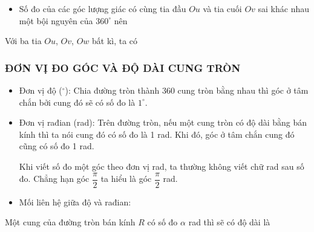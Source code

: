\begin{itemize}
\begin{center}
			\end{center}
			\item Số đo của các góc lượng giác có cùng tia đầu $Ou$ và tia cuối $Ov$ sai khác nhau một bội nguyên của $360^{\circ}$ nên
		\end{itemize}

	\iconMT {} Với ba tia $Ou$, $Ov$, $Ow$ bất kì, ta có


\subsubsection{ĐƠN VỊ ĐO GÓC VÀ ĐỘ DÀI CUNG TRÒN}
\iconMT {}
	\begin{itemize}
		\item Đơn vị độ ($^\circ$): Chia đường tròn thành 360 cung tròn bằng nhau thì góc ở tâm chắn bởi cung đó sẽ có số đo là $1^\circ$.
		\item Đơn vị rađian (rad): Trên đường tròn, nếu một cung tròn có độ dài bằng bán kính thì ta nói cung đó có số đo là 1 rad. Khi đó, góc ở tâm chắn cung đó cũng có số đo 1 rad.
		\begin{note}
			Khi viết số đo một góc theo đơn vị rad, ta thường không viết chữ rad sau số đo. Chẳng hạn góc $\dfrac{\pi}{2}$ ta hiểu là góc $\dfrac{\pi}{2}$ rad.
		\end{note}
		\item Mối liên hệ giữa độ và rađian:
	\end{itemize}
\iconMT {} Một cung của đường tròn bán kính $R$ có số đo $\alpha$ rad thì sẽ có độ dài là 


